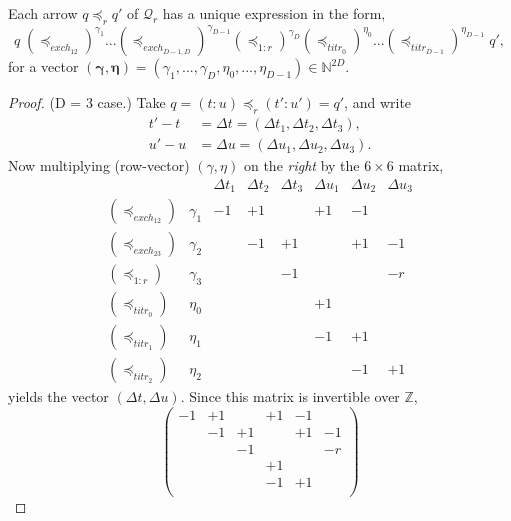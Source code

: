 \documentclass{article}
\newcommand{\N}{\mathbb{N}}
\newcommand{\Q}{\ensuremath{\mathcal{Q}}}
\begin{document}
\begin{thm}\label{coefs}
  Each arrow $q \preceq_r q'$ of $\Q_r$ has a unique expression in the form,
  \begin{equation}
  q\;(\preceq_{exch_{12}})^{\gamma_1} ... (\preceq_{exch_{D-1,D}})^{\gamma_{D-1}} (\preceq_{1:r})^{\gamma_D} (\preceq_{titr_0})^{\eta_0} ... (\preceq_{titr_{D-1}})^{\eta_{D-1}} \;q', \label{uniqely}
  \end{equation}
  for a vector $(\mathbf{\gamma},\mathbf{\eta}) = (\gamma_1, ..., \gamma_D, \eta_0, ..., \eta_{D-1}) \in \N^{2D}$.
\end{thm}
\begin{proof}
  (D = 3 case.)  Take $q = (t\!:\!u) \preceq_r (t'\!:\!u') = q'$, and write
  \begin{equation}
    \begin{aligned}
      t'-t &= \Delta t = (\Delta t_1, \Delta t_2, \Delta t_3), \\
      u'-u &= \Delta u = (\Delta u_1, \Delta u_2, \Delta u_3).
    \end{aligned}    
  \end{equation}
  Now multiplying (row-vector) $(\gamma,\eta)$ on the {\em right} by the $6\times 6$ matrix,
  $$
  \begin{array}{crcccccc}
    & & \Delta t_1 & \Delta t_2 & \Delta t_3 & \Delta u_1 & \Delta u_2 & \Delta u_3 \\
    (\preceq_{exch_{12}}) & \gamma_1 & -1 & +1 &    & +1 & -1 &    \\
    (\preceq_{exch_{23}}) & \gamma_2 &    & -1 & +1 &    & +1 & -1 \\
    (\preceq_{1:r})     & \gamma_3 &    &    & -1 &    &    & -r \\
    (\preceq_{titr_0})   & \eta_0   &    &    &    & +1 &    &    \\
    (\preceq_{titr_1})   & \eta_1   &    &    &    & -1 & +1 &    \\
    (\preceq_{titr_2})   & \eta_2   &    &    &    &    & -1 & +1
  \end{array}
  $$
  yields the vector $(\Delta t,\Delta u)$.
  Since this matrix is invertible over $\mathbb{Z}$,
  $$
  \begin{pmatrix}
    -1 & +1 &    & +1 & -1 &    \\
       & -1 & +1 &    & +1 & -1 \\
       &    & -1 &    &    & -r \\
       &    &    & +1 &    &    \\
       &    &    & -1 & +1 &    \\

\end{pmatrix}$$
\end{proof}
\end{document}
